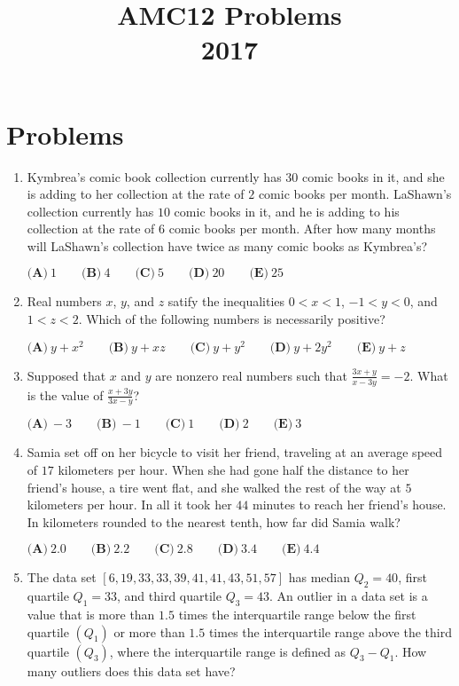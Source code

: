 \documentclass{article}
\title{AMC12 Problems \\ 2017}
\date{}
\begin{document}
\maketitle\thispagestyle{fancy}\newpage\section*{Problems}\begin{enumerate}[label=\arabic*., itemsep=0.5em]\item Kymbrea's comic book collection currently has $30$ comic books in it, and she is adding to her collection at the rate of $2$ comic books per month. LaShawn's collection currently has $10$ comic books in it, and he is adding to his collection at the rate of $6$ comic books per month. After how many months will LaShawn's collection have twice as many comic books as Kymbrea's?

$\textbf{(A)}\ 1\qquad\textbf{(B)}\ 4\qquad\textbf{(C)}\ 5\qquad\textbf{(D)}\ 20\qquad\textbf{(E)}\ 25$\par \vspace{0.5em}\item Real numbers $x$, $y$, and $z$ satify the inequalities
$0<x<1$, $-1<y<0$, and $1<z<2$.
Which of the following numbers is necessarily positive?

$\textbf{(A)}\ y+x^2\qquad\textbf{(B)}\ y+xz\qquad\textbf{(C)}\ y+y^2\qquad\textbf{(D)}\ y+2y^2\qquad\textbf{(E)}\ y+z$\par \vspace{0.5em}\item Supposed that $x$ and $y$ are nonzero real numbers such that $\frac{3x+y}{x-3y}=-2$. What is the value of $\frac{x+3y}{3x-y}$?

$\textbf{(A)}\ -3\qquad\textbf{(B)}\ -1\qquad\textbf{(C)}\ 1\qquad\textbf{(D)}\ 2\qquad\textbf{(E)}\ 3$\par \vspace{0.5em}\item Samia set off on her bicycle to visit her friend, traveling at an average speed of $17$ kilometers per hour. When she had gone half the distance to her friend's house, a tire went flat, and she walked the rest of the way at $5$ kilometers per hour. In all it took her $44$ minutes to reach her friend's house. In kilometers rounded to the nearest tenth, how far did Samia walk?

$\textbf{(A)}\ 2.0\qquad\textbf{(B)}\ 2.2\qquad\textbf{(C)}\ 2.8\qquad\textbf{(D)}\ 3.4\qquad\textbf{(E)}\ 4.4$\par \vspace{0.5em}\item The data set $[6,19,33,33,39,41,41,43,51,57]$ has median $Q_2 = 40$, first quartile $Q_1 = 33$, and third quartile $Q_3=43$. An outlier in a data set is a value that is more than $1.5$ times the interquartile range below the first quartile $(Q_1)$ or more than $1.5$ times the interquartile range above the third quartile $(Q_3)$, where the interquartile range is defined as $Q_3 - Q_1$. How many outliers does this data set have?


\end{enumerate}
\end{document}
